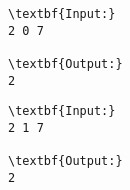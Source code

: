\begin{verbatim}
\textbf{Input:}
2 0 7

\textbf{Output:}
2\end{verbatim}
\begin{verbatim}
\textbf{Input:}
2 1 7

\textbf{Output:}
2\end{verbatim}